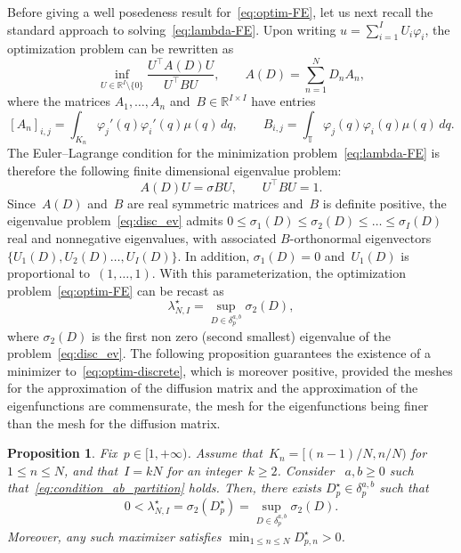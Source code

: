 \documentclass{article}
\newtheorem{proposition}{Proposition}
\newcommand{\dps}{\displaystyle }
\newcommand{\R}{\mathbb{R}}
\renewcommand{\leq}{\leqslant}
\renewcommand{\geq}{\geqslant}
\def\R{\mathbb{R}}
\def\T{\mathbb{T}}
\newcommand{\diff}{D}
\newcommand{\diffset}{\delta}
\begin{document}
Before giving a well posedeness result for~\eqref{eq:optim-FE}, let us next recall the standard approach to solving~\eqref{eq:lambda-FE}. Upon writing $u = \sum_{i=1}^I U_i \varphi_i$, the optimization problem can be rewritten as
\[
\inf_{U \in \R^I \setminus \{0\}} \frac{U^\top A(\diff) U}{U^\top B U}, \qquad A(\diff) = \sum_{n=1}^N \diff_n A_n,
\]
where the matrices $A_1,\dots,A_n$ and~$B \in \R^{I \times I}$ have entries
\begin{equation}
  \label{eq:A-M-mat}
  [A_n]_{i,j} = \int_{K_n} \varphi_j'(q) \varphi_i'(q) \mu(q)\,dq,
  \qquad
  B_{i,j} = \int_{\T} \varphi_j(q) \varphi_i(q) \mu(q)\,dq.
\end{equation}
The Euler--Lagrange condition for the minimization problem~\eqref{eq:lambda-FE} is therefore the following finite dimensional eigenvalue problem:
\begin{equation}
  \label{eq:disc_ev}
  A(\diff)U = \sigma B U, \qquad U^\top B U = 1.
\end{equation}
Since~$A(\diff)$ and~$B$ are real symmetric matrices and~$B$ is definite positive, the eigenvalue problem~\eqref{eq:disc_ev} admits $0 \leq \sigma_1(\diff)\leq \sigma_2(\diff)\leq\ldots\leq \sigma_{I}(\diff)$ real and nonnegative eigenvalues, with associated $B$-orthonormal eigenvectors~$\{U_1(\diff),U_2(\diff)\ldots, U_{I}(\diff)\}$. In addition, $\sigma_1(\diff) = 0$ and~$U_1(\diff)$ is proportional to~$(1,\dots,1)$. With this parameterization, the optimization problem~\eqref{eq:optim-FE} can be recast as
\begin{equation}
  \label{eq:optim-discrete}
  \lambda_{N,I}^{\star} = \sup_{\diff \in \diffset_p^{a,b}} \sigma_2(\diff),
\end{equation}
where $\sigma_2(\diff)$ is the first non zero (second smallest) eigenvalue of the problem~\eqref{eq:disc_ev}. The following proposition guarantees the existence of a minimizer to~\eqref{eq:optim-discrete}, which is moreover positive, provided the meshes for the approximation of the diffusion matrix and the approximation of the eigenfunctions are commensurate, the mesh for the eigenfunctions being finer than the mesh for the diffusion matrix.

\begin{proposition}
  \label{lem:well-posed-disc}
  Fix~$p \in [1,+\infty)$. Assume that~$K_n = [(n-1)/N, n/N)$ for~$1 \leq n \leq N$, and that~$I = kN$ for an integer~$k \geq 2$. Consider ~$a,b \geq 0$ such that~\eqref{eq:condition_ab_partition} holds. Then, there exists $\diff_p^{\star}\in \diffset_p^{a,b}$ such that 
  \[
  0 < \lambda_{N,I}^{\star} = \sigma_2(\diff^\star_p) = \sup_{\diff \in \diffset_p^{a,b}} \sigma_2(\diff).
  \]
  Moreover, any such maximizer satisfies $\dps \min_{1 \leq n \leq N} \diff^\star_{p,n}>0$.
\end{proposition}
\end{document}
